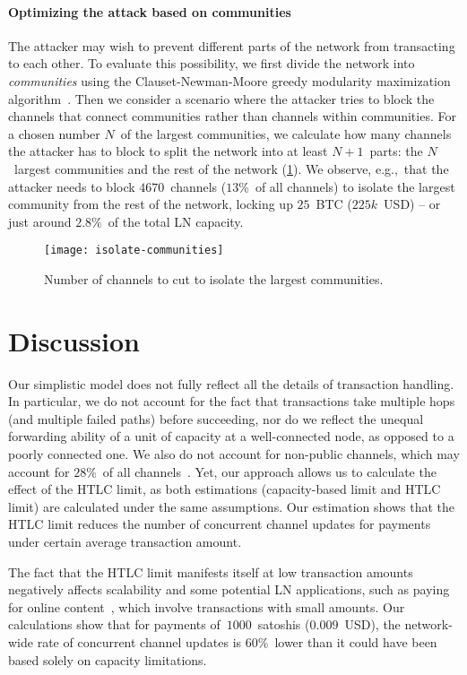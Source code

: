 \paragraph{Optimizing the attack based on communities}
The attacker may wish to prevent different parts of the network from transacting to each other.
To evaluate this possibility, we first divide the network into \textit{communities} using the Clauset-Newman-Moore greedy modularity maximization algorithm~\cite{Clauset2004}.
Then we consider a scenario where the attacker tries to block the channels that connect communities rather than channels within communities.
For a chosen number $N$~of the largest communities, we calculate how many channels the attacker has to block to split the network into at least $N+1$~parts: the $N$~largest communities and the rest of the network (\cref{fig:isolate-communities}).
We observe, e.g.,~that the attacker needs to block $4670$~channels ($13\%$~of all channels) to isolate the largest community from the rest of the network, locking up $25$~BTC ($225k$~USD) -- or just around $2.8\%$~of the total LN capacity.

\begin{figure}[tb]
	\centering
	\texttt{[image: isolate-communities]}
	\caption{Number of channels to cut to isolate the largest communities.}
	\label{fig:isolate-communities}
\end{figure}


\section{Discussion}
Our simplistic model does not fully reflect all the details of transaction handling.
In particular, we do not account for the fact that transactions take multiple hops (and multiple failed paths) before succeeding, nor do we reflect the unequal forwarding ability of a unit of capacity at a well-connected node, as opposed to a poorly connected one.
We also do not account for non-public channels, which may account for $28\%$~of all channels~\cite{BitMEXPrivateChannels}.
Yet, our approach allows us to calculate the effect of the HTLC limit, as both estimations (capacity-based limit and HTLC limit) are calculated under the same assumptions.
Our estimation shows that the HTLC limit reduces the number of concurrent channel updates for payments under certain average transaction amount.

The fact that the HTLC limit manifests itself at low transaction amounts negatively affects scalability and some potential LN applications, such as paying for online content~\cite{Poon2016}, which involve transactions with small amounts. 
Our calculations show that for payments of~$1000$~satoshis ($0.009$~USD), the network-wide rate of concurrent channel updates is $60\%$~lower than it could have been based solely on capacity limitations.


